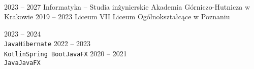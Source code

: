 \documentclass[9pt]{developercv} %
\begin{document}

\begin{minipage}[t]{0.4\textwidth} %
	\vspace{-\baselineskip} %
	
	\lorem \lorem \lorem \lorem \lorem\\ %
\end{minipage}
\hfill %
\begin{minipage}[t]{0.5\textwidth} %
	\vspace{-\baselineskip} %
	\begin{barchart}{5.5}
	\end{barchart}
\end{minipage}




\begin{entrylist}
	\entry
		{2023 -- 2027}
		{Informatyka -- Studia inżynierskie}
		{Akademia Górniczo-Hutnicza w Krakowie}
		{\lorem\lorem}
      \entry
		{2019 -- 2023}
		{Liceum}
		{VII Liceum Ogólnokształcące w Poznaniu}
		{\lorem\lorem}
\end{entrylist}


\begin{entrylist}
    \entry
		{2023 -- 2024}
		{\lorem}
		{}
		{\lorem \lorem \lorem\\ \texttt{Java}\slashsep\texttt{Hibernate}}
	\entry
		{2022 -- 2023}
		{\lorem}
		{}
		{\lorem \lorem \lorem\\ \texttt{Kotlin}\slashsep\texttt{Spring Boot}\slashsep\texttt{JavaFX}}
	\entry
		{2020 -- 2021}
		{\lorem}
		{}
		{\lorem \lorem \lorem\\ \texttt{Java}\slashsep\texttt{JavaFX}}
\end{entrylist}
\end{document}
